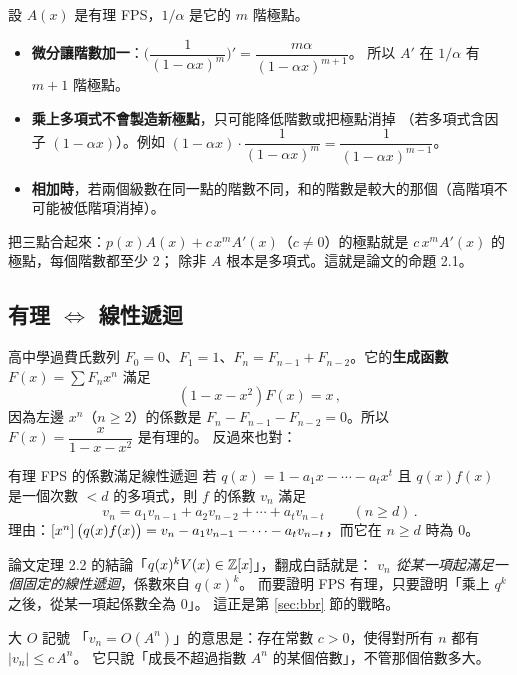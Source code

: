 \begin{keyidea}
設 $A(x)$ 是有理 FPS，$1/\alpha$ 是它的 $m$ 階極點。
\begin{itemize}
  \item \textbf{微分讓階數加一}：$\Big(\dfrac{1}{(1-\alpha x)^m}\Big)'=\dfrac{m\alpha}{(1-\alpha x)^{m+1}}$。
        所以 $A'$ 在 $1/\alpha$ 有 $m+1$ 階極點。
  \item \textbf{乘上多項式不會製造新極點}，只可能降低階數或把極點消掉
        （若多項式含因子 $(1-\alpha x)$）。例如 $(1-\alpha x)\cdot\dfrac{1}{(1-\alpha x)^m}=\dfrac{1}{(1-\alpha x)^{m-1}}$。
  \item \textbf{相加時}，若兩個級數在同一點的階數不同，和的階數是較大的那個（高階項不可能被低階項消掉）。
\end{itemize}
把三點合起來：$p(x)A(x)+c\,x^{m}A'(x)$（$c\neq0$）的極點就是 $c\,x^mA'(x)$ 的極點，每個階數都至少 $2$；
除非 $A$ 根本是多項式。這就是論文的命題 2.1。
\end{keyidea}

\subsection{有理 $\Leftrightarrow$ 線性遞迴}

高中學過費氏數列 $F_0=0$、$F_1=1$、$F_n=F_{n-1}+F_{n-2}$。它的\textbf{生成函數}
$F(x)=\sum F_nx^n$ 滿足
\[
  (1-x-x^2)F(x)=x\,,
\]
因為左邊 $x^n$（$n\ge2$）的係數是 $F_n-F_{n-1}-F_{n-2}=0$。所以 $F(x)=\dfrac{x}{1-x-x^2}$ 是有理的。
反過來也對：
\begin{prereq}{有理 FPS 的係數滿足線性遞迴}
若 $q(x)=1-a_1x-\cdots-a_tx^t$ 且 $q(x)f(x)$ 是一個次數 $<d$ 的多項式，則 $f$ 的係數 $v_n$ 滿足
\[
  v_n=a_1v_{n-1}+a_2v_{n-2}+\cdots+a_tv_{n-t}\qquad(n\ge d)\,.
\]
理由：$[x^{n}]\,\big(q(x)f(x)\big)=v_n-a_1v_{n-1}-\cdots-a_tv_{n-t}$，而它在 $n\ge d$ 時為 $0$。
\end{prereq}
論文定理 2.2 的結論「$q(x)^kV(x)\in\mathbb{Z}[x]$」，翻成白話就是：
\emph{$v_n$ 從某一項起滿足一個固定的線性遞迴}，係數來自 $q(x)^k$。
而要證明 FPS 有理，只要證明「乘上 $q^k$ 之後，從某一項起係數全為 $0$」。
這正是第 \ref{sec:bbr} 節的戰略。

\begin{prereq}{大 $O$ 記號}
「$v_n=O(A^n)$」的意思是：存在常數 $c>0$，使得對所有 $n$ 都有 $|v_n|\le c\,A^n$。
它只說「成長不超過指數 $A^n$ 的某個倍數」，不管那個倍數多大。
\end{prereq}
